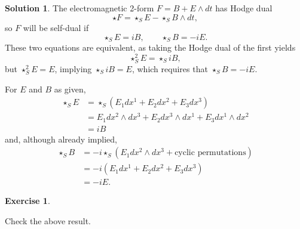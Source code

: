 \documentclass[11pt, a4paper]{report}
\theoremstyle{definition}
\newtheorem{ex}{Exercise}[part]
\newtheorem{sol}{Solution}[part]
\begin{document}
\begin{sol}

The electromagnetic 2-form $F = B + E \wedge dt$ has Hodge dual
\[
    \star F = \star_S E - \star_S B \wedge dt,
\]
so $F$ will be self-dual if
\[
    \star_S E = iB, \qquad \star_S B = -iE.
\]
These two equations are equivalent, as taking the Hodge dual of the first yields
\[
    \star_S^2 E = \star_S iB,
\]
but $\star_S^2 E = E$, implying $\star_S iB = E$, which requires that $\star_S B = -iE$.

For $E$ and $B$ as given,
\begin{align*}
    \star_S E &= \star_S (E_1 dx^1 + E_2 dx^2 + E_3 dx^3) \\
        &= E_1 dx^2 \wedge dx^3 + E_2 dx^3 \wedge dx^1 + E_3 dx^1 \wedge dx^2 \\
        &= iB
\end{align*}
and, although already implied,
\begin{align*}
    \star_S B &= -i \star_S (E_1 dx^2 \wedge dx^3 + \text{cyclic permutations}) \\
              &= -i (E_1 dx^1 + E_2 dx^2 + E_3 dx^3) \\
              &= -iE.
\end{align*}

\end{sol}

\begin{ex}\label{ex:planewavemaxwelleq2}

Check the above result.

\end{ex}
\end{document}
